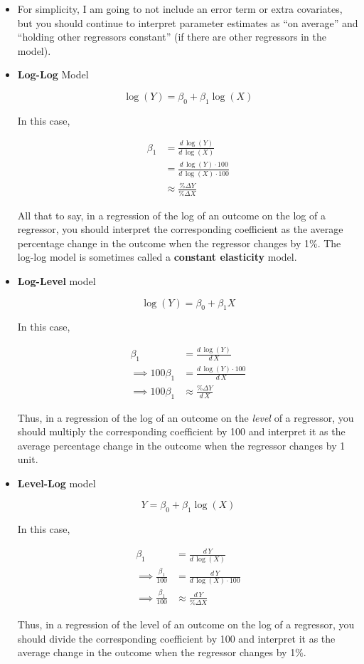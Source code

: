 \documentclass[
  letterpaper,
  DIV=11,
  numbers=noendperiod]{scrreprt}
\begin{document}
\begin{itemize}
\item
  For simplicity, I am going to not include an error term or extra
  covariates, but you should continue to interpret parameter estimates
  as ``on average'' and ``holding other regressors constant'' (if there
  are other regressors in the model).
\item
  \textbf{Log-Log} Model

  \[
    \log(Y) = \beta_0 + \beta_1 \log(X)
    \]

  In this case,

  \[
    \begin{aligned}
    \beta_1 &= \frac{ d \, \log(Y) }{d \, \log(X)} \\
    &= \frac{ d \, \log(Y) \cdot 100 }{d \, \log(X) \cdot 100} \\
    &\approx \frac{ \% \Delta Y}{ \% \Delta X}
    \end{aligned}
    \]

  All that to say, in a regression of the log of an outcome on the log
  of a regressor, you should interpret the corresponding coefficient as
  the average percentage change in the outcome when the regressor
  changes by 1\%. The log-log model is sometimes called a
  \textbf{constant elasticity} model.
\item
  \textbf{Log-Level} model

  \[
    \log(Y) = \beta_0 + \beta_1 X
    \]

  In this case,

  \[
    \begin{aligned}
    \beta_1 &= \frac{ d \, \log(Y) }{d \, X} \\
    \implies 100 \beta_1 &= \frac{ d \, \log(Y) \cdot 100 }{d \, X} \\
    \implies 100 \beta_1 &\approx \frac{ \% \Delta Y}{ d \, X}
    \end{aligned}
    \]

  Thus, in a regression of the log of an outcome on the \emph{level} of
  a regressor, you should multiply the corresponding coefficient by 100
  and interpret it as the average percentage change in the outcome when
  the regressor changes by 1 unit.
\item
  \textbf{Level-Log} model

  \[
      Y = \beta_0 + \beta_1 \log(X)
    \]

  In this case,

  \[
      \begin{aligned}
      \beta_1 &= \frac{d\, Y}{d \, \log(X)} \\
      \implies \frac{\beta_1}{100} &= \frac{d \, Y}{d \, \log(X) \cdot 100} \\
      \implies \frac{\beta_1}{100} &\approx \frac{d \, Y}{\% \Delta X}
      \end{aligned}
    \]

  Thus, in a regression of the level of an outcome on the log of a
  regressor, you should divide the corresponding coefficient by 100 and
  interpret it as the average change in the outcome when the regressor
  changes by 1\%.
\end{itemize}
\end{document}
